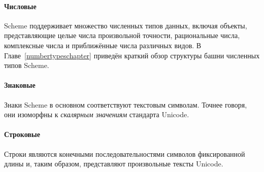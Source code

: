 \paragraph{Числовые}\vspace{1mm}

Scheme поддерживает множество численных типов данных, включая
объекты, представляющие целые числа произвольной точности, рациональные числа, комплексные числа и
приближённые числа различных видов. В Главе~\ref{numbertypeschapter} приведён краткий обзор структуры
башни численных типов Scheme.\vspace{1mm}

\paragraph{Знаковые}\vspace{1mm}

Знаки Scheme в основном соответствуют текстовым символам. Точнее говоря,
они изоморфны к \textit{скалярным значениям} стандарта Unicode.

\paragraph{Строковые}

Строки являются конечными последовательностями символов фиксированной длины и,
таким образом, представляют произвольные тексты Unicode.

